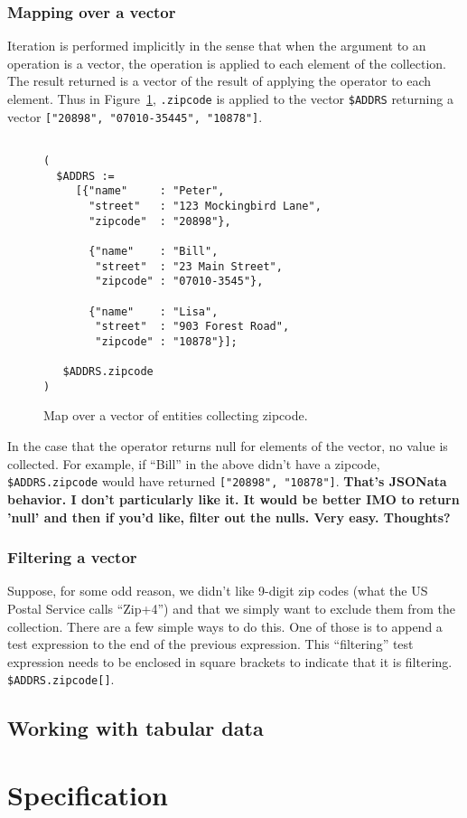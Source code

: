 \documentclass[9pt,letterpaper]{article}
\begin{document}
\subsubsection{Mapping over a vector}
Iteration is performed implicitly in the sense that when the argument to an operation is a vector, the operation is applied to each element of the collection.
The result returned is a vector of the result of applying the operator to each element.
Thus in Figure~\ref{code:simple-map}, \texttt{.zipcode} is applied to the vector \texttt{\$ADDRS} returning  a vector \texttt{["20898", "07010-35445", "10878"]}.


\begin{figure}[H]
    \caption{Map over a vector of entities collecting zipcode.}
    \label{code:simple-map}
\begin{lstlisting}

(
  $ADDRS :=
     [{"name"     : "Peter",
       "street"   : "123 Mockingbird Lane",
       "zipcode"  : "20898"},
       
       {"name"    : "Bill",
        "street"  : "23 Main Street",
        "zipcode" : "07010-3545"},
        
       {"name"    : "Lisa",
        "street"  : "903 Forest Road",
        "zipcode" : "10878"}];

   $ADDRS.zipcode
)

\end{lstlisting}
\end{figure}    

  In the case that the operator returns null for elements of the vector, no value is collected.
  For example, if ``Bill'' in the above didn't have a zipcode, \texttt{\$ADDRS.zipcode} would have returned \texttt{["20898", "10878"]}.
  \textbf{That's JSONata behavior. I don't particularly like it. It would be better IMO to return 'null' and then if you'd like, filter out the nulls.
    Very easy. Thoughts?}

\subsubsection{Filtering  a vector}
Suppose, for some odd reason, we didn't like 9-digit zip codes (what the US Postal Service calls ``Zip+4'') and that we simply want to exclude them from the collection.
There are a few simple ways to do this.
One of those is to append a test expression to the end of the previous expression. This ``filtering'' test expression needs to be enclosed in square brackets to indicate that it is filtering.
\texttt{\$ADDRS.zipcode[]}.
  

\subsection{Working with tabular data}

\section{Specification}

%

\end{document}

